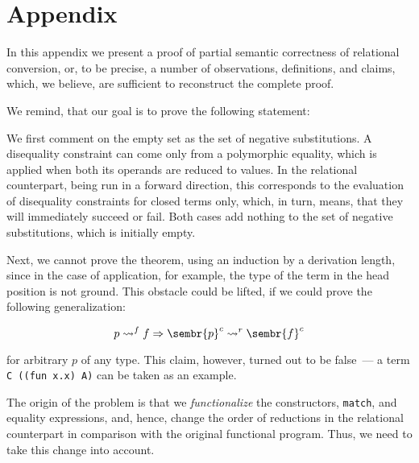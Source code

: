 \section{Appendix}
\label{appendix}

In this appendix we present a proof of partial semantic correctness of relational conversion, or, to be precise, 
a number of observations, definitions, and claims, which, we believe, are sufficient to reconstruct
the complete proof. 

We remind, that our goal is to prove the following statement:

  
We first comment on the empty set as the set of negative substitutions. A disequality constraint can
come only from a polymorphic equality, which is applied when both its operands are reduced to
values. In the relational counterpart, being run in a forward direction, this corresponds to the evaluation of disequality constraints for
closed terms only, which, in turn, means, that they will immediately succeed or fail. Both cases
add nothing to the set of negative substitutions, which is initially empty. 

Next, we cannot prove the theorem, using an induction by a derivation length, since in the case of
application, for example, the type of the term in the head position is not ground. This 
obstacle could be lifted, if we could prove the following generalization:

$$
p\leadsto^f f \Rightarrow \sembr{p}^c\leadsto^r\sembr{f}^c
$$ 

\noindent for arbitrary $p$ of any type. This claim, however, turned out to be false~--- a term
\lstinline|C ((fun x.x) A)| can be taken as an example.  

The origin of the problem is that we \emph{functionalize} the constructors, \lstinline|match|, and
equality expressions, and, hence, change the order of reductions in the relational counterpart in 
comparison with the original functional program. Thus, we need to take this change into account.

